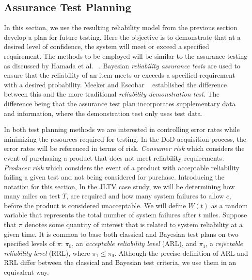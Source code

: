 \documentclass[12pt]{article}
\begin{document}
\subsection{Assurance Test Planning}
In this section, we use the resulting reliability model from the previous
section develop a plan for future testing.  Here the objective is to demonstrate
that at a desired level of confidence, the system will meet or exceed a
specified requirement. The methods to be employed will be similar to the
assurance testing as discussed by Hamada et al. ~\cite{ref4}. Bayesian
\emph{reliability assurance tests} are used to ensure that the reliability of
an item meets or exceeds a specified requirement with a desired probability.
Meeker and Escobar ~\cite{ME04} established the difference between this and the
more traditional  \emph{reliability demonstration test}.  The difference being
that the assurance test plan incorporates supplementary data and information,
where the demonstration test only uses test data.

In both test planning methods we are interested in controlling error rates while
minimizing the resources required for testing.  In the DoD acquisition process,
the error rates will be referenced in terms of risk. \emph{Consumer risk} which
considers the event of purchasing a product that does not meet reliability
requirements.  \emph{Producer risk} which considers the event of a product with
acceptable reliability failing a given test and not being considered for
purchase.  Introducing the notation for this section, In the JLTV case study, we
will be determining how many miles on test $T$, are required and how many system
failures to allow $c$, before the product is considered unacceptable.  We will
define $W(t)$ as a random variable that represents the total number of system
failures after $t$ miles.  Suppose that $\pi$ denotes some quantity of interest
that is related to system reliability at a given time. It is common to base both
classical and Bayesian test plans on two specified levels of $\pi$: $\pi_0$, an
\emph{acceptable reliability level} (ARL), and $\pi_1$, a \emph{rejectable
reliability level} (RRL), where $\pi_1 \leq  \pi_0$. Although the precise
definition of ARL and RRL differ between the classical and Bayesian test
criteria, we use them in an equivalent way.
\end{document}
